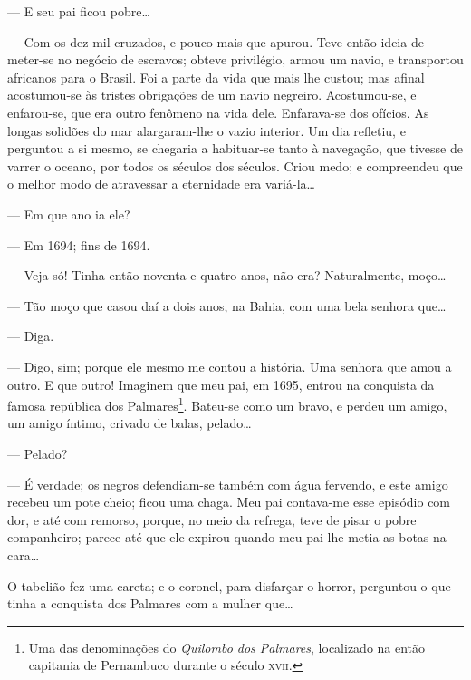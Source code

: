 --- E seu pai ficou pobre\ldots{}

--- Com os dez mil cruzados, e pouco mais que apurou. Teve então ideia
de meter-se no negócio de escravos; obteve privilégio, armou um navio, e
transportou africanos para o Brasil. Foi a parte da vida que mais lhe
custou; mas afinal acostumou-se às tristes obrigações de um navio
negreiro. Acostumou-se, e enfarou-se, que era outro fenômeno na vida
dele. Enfarava-se dos ofícios. As longas solidões do mar alargaram-lhe o
vazio interior. Um dia refletiu, e perguntou a si mesmo, se chegaria a
habituar-se tanto à navegação, que tivesse de varrer o oceano, por todos
os séculos dos séculos. Criou medo; e compreendeu que o melhor modo de
atravessar a eternidade era variá-la\ldots{}

--- Em que ano ia ele?

--- Em 1694; fins de 1694.

--- Veja só! Tinha então noventa e quatro anos, não era? Naturalmente,
moço\ldots{}

--- Tão moço que casou daí a dois anos, na Bahia, com uma bela senhora
que\ldots{}

--- Diga.

--- Digo, sim; porque ele mesmo me contou a história. Uma senhora que
amou a outro. E que outro! Imaginem que meu pai, em 1695, entrou na
conquista da famosa república dos Palmares\footnote{Uma das denominações
  do \emph{Quilombo dos Palmares}, localizado na então capitania de
  Pernambuco durante o século \textsc{xvii}.}. Bateu-se como um bravo, e perdeu
um amigo, um amigo íntimo, crivado de balas, pelado\ldots{}

--- Pelado?

--- É verdade; os negros defendiam-se também com água fervendo, e este
amigo recebeu um pote cheio; ficou uma chaga. Meu pai contava-me esse
episódio com dor, e até com remorso, porque, no meio da refrega, teve de
pisar o pobre companheiro; parece até que ele expirou quando meu pai lhe
metia as botas na cara\ldots{}

O tabelião fez uma careta; e o coronel, para disfarçar o horror,
perguntou o que tinha a conquista dos Palmares com a mulher que\ldots{}

